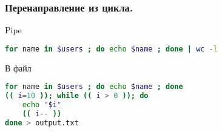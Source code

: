 \begin{frame}[fragile]
\frametitle{Перенаправление из цикла.}
  \begin{block}{Pipe}
    \begin{lstlisting}[language=sh,frame=single]
for name in $users ; do echo $name ; done | wc -l
    \end{lstlisting}
  \end{block}
  \begin{block}{В файл}
    \begin{lstlisting}[language=sh,frame=single]
for name in $users ; do echo $name ; done
(( i=10 )); while (( i > 0 )); do 
    echo "$i"
    (( i-- ))
done > output.txt
    \end{lstlisting}
  \end{block}
\end{frame}
